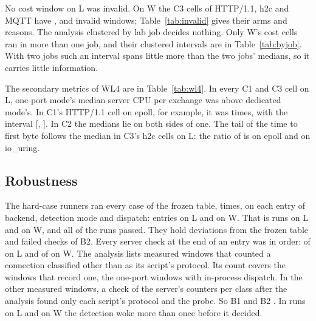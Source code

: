 No cost window on L was invalid. On W the C3 cells of HTTP/1.1, h2c and MQTT have
\CThreeWIocpHttpInvalidWindows, \CThreeWIocpHTwoCInvalidWindows{} and
\CThreeWIocpMqttInvalidWindows{} invalid windows; Table~\ref{tab:invalid} gives their arms and
reasons. The analysis clustered by lab job decides nothing. Only W's cost cells ran in more than one
job, and their clustered intervals are in Table~\ref{tab:byjob}. With two jobs such an interval
spans little more than the two jobs' medians, so it carries little information.

The secondary metrics of WL4 are in Table~\ref{tab:wl4}. In every C1 and C3 cell on L, one-port
mode's median server CPU per exchange was above dedicated mode's. In C1's HTTP/1.1 cell on epoll,
for example, it was \SecWLFourCOneLEpollHttpCpuMedian{} times, with the interval
[\SecWLFourCOneLEpollHttpCpuLow, \SecWLFourCOneLEpollHttpCpuHigh]. In C2 the medians lie on both
sides of one. The tail of the time to first byte follows the median in C3's h2c cells on L: the
ratio of \PNinetyNine{} is \SecWLFourCThreeLEpollHTwoCTtfbPNinetyNineMedian{} on epoll and
\SecWLFourCThreeLIouringHTwoCTtfbPNinetyNineMedian{} on io\_uring.

\subsection{Robustness}\label{sec:res-robust}

 The hard-case runners ran every case of the frozen table, \CaseReps{} times, on
each entry of backend, detection mode and dispatch: \HardcaseLEntries{} entries on L and
\HardcaseWEntries{} on W. That is \HardcaseLRuns{} runs on L and \HardcaseWRuns{} on W, and all
\HardcasePassed{} of the \HardcaseRuns{} runs passed. They hold \HardcaseBOneDeviations{}
deviations from the frozen table and \HardcaseBTwoFailures{} failed checks of B2. Every server check
at the end of an entry was in order: \HardcaseLServerChecksOk{} of \HardcaseLServerChecks{} on L
and \HardcaseWServerChecksOk{} of \HardcaseWServerChecks{} on W. The analysis lists \BOneFailures{}
measured windows that counted a connection classified other than as its script's protocol. Its
count covers the windows that record one, the one-port windows with in-process dispatch. In the
other measured windows, a check of the server's counters per class after the analysis found only
each script's protocol and the probe. So B1 \BOneVerdict{} and B2 \BTwoVerdict. In
\HardcaseLWokeMoreThanOnce{} runs on L and \HardcaseWWokeMoreThanOnce{} on W the detection woke
more than once before it decided.

